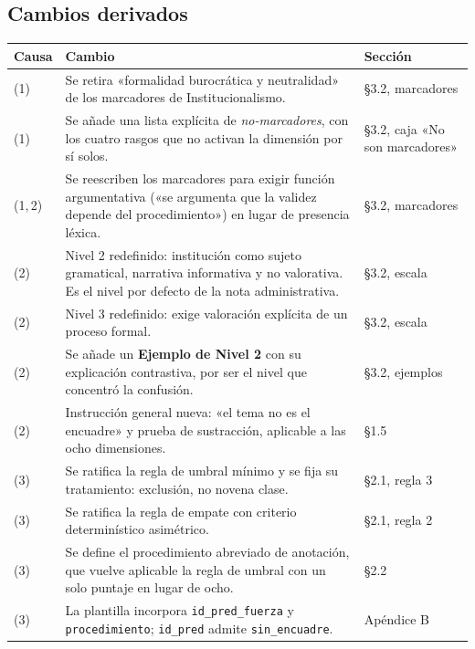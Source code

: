 \documentclass[11pt,letterpaper]{article}
\begin{document}
\subsection{Cambios derivados}
\begin{longtable}{@{}p{1.0cm}p{7.6cm}p{6.6cm}@{}}
\toprule \textbf{Causa} & \textbf{Cambio} & \textbf{Sección}\\ \midrule\endhead
(1) & Se retira «formalidad burocrática y neutralidad» de los marcadores de Institucionalismo. &
§3.2, marcadores\\
\addlinespace
(1) & Se añade una lista explícita de \emph{no-marcadores}, con los cuatro rasgos que no activan la dimensión
por sí solos. & §3.2, caja «No son marcadores»\\
\addlinespace
(1,\,2) & Se reescriben los marcadores para exigir función argumentativa («se argumenta que la validez
depende del procedimiento») en lugar de presencia léxica. & §3.2, marcadores\\
\addlinespace
(2) & Nivel 2 redefinido: institución como sujeto gramatical, narrativa informativa y no valorativa. Es el nivel
por defecto de la nota administrativa. & §3.2, escala\\
\addlinespace
(2) & Nivel 3 redefinido: exige valoración explícita de un proceso formal. & §3.2, escala\\
\addlinespace
(2) & Se añade un \textbf{Ejemplo de Nivel 2} con su explicación contrastiva, por ser el nivel que concentró
la confusión. & §3.2, ejemplos\\
\addlinespace
(2) & Instrucción general nueva: «el tema no es el encuadre» y prueba de sustracción, aplicable a las ocho
dimensiones. & §1.5\\
\addlinespace
(3) & Se ratifica la regla de umbral mínimo y se fija su tratamiento: exclusión, no novena clase. & §2.1,
regla 3\\
\addlinespace
(3) & Se ratifica la regla de empate con criterio determinístico asimétrico. & §2.1, regla 2\\
\addlinespace
(3) & Se define el procedimiento abreviado de anotación, que vuelve aplicable la regla de umbral con un solo
puntaje en lugar de ocho. & §2.2\\
\addlinespace
(3) & La plantilla incorpora \texttt{id\_pred\_fuerza} y \texttt{procedimiento}; \texttt{id\_pred} admite
\texttt{sin\_encuadre}. & Apéndice B\\
\bottomrule
\end{longtable}
\end{document}
